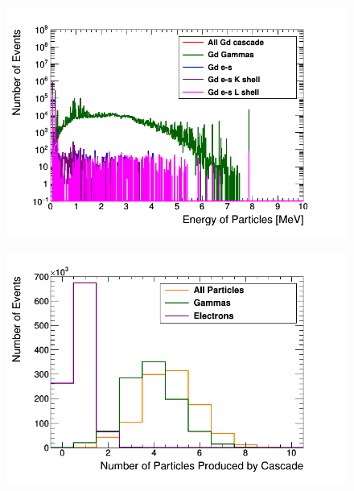 \begin{figure}[!h]
\centering
\begin{minipage}{.45\textwidth}
  \centering
  \includegraphics[width=\linewidth]{Chapter4/Figs/Raster/gadolinium/gadoliniumEnergiesCascade.png}
  \label{fig:gadoliniumEnergiesCascade}
\end{minipage}%
\qquad
\begin{minipage}{.45\textwidth}
  \centering
  \includegraphics[width=\linewidth]{Chapter4/Figs/Raster/gadolinium/gadoliniumMultipliciesBreakdownCascade.png} 
  \label{fig:gadoliniumMultipliciesBreakdownCascade}
\end{minipage}
\end{figure}

